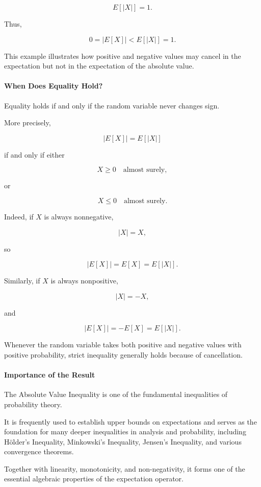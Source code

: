 \documentclass[11pt]{article}
\begin{document}
\begin{mdframed}[
		linewidth=0.8pt,
		roundcorner=6pt,
		backgroundcolor=gray!5,
		linecolor=gray!60,
		innertopmargin=10pt,
		innerbottommargin=10pt,
		innerleftmargin=10pt,
		innerrightmargin=10pt
		]
		\[
		E[|X|]
		=
		1.
		\]
		
		Thus,
		
		\[
		\boxed{
			0
			=
			|E[X]|
			<
			E[|X|]
			=
			1.
		}
		\]
		
		This example illustrates how positive and negative values may cancel in the
		expectation but not in the expectation of the absolute value.
		
		\bigskip
		
		\paragraph{When Does Equality Hold?}
		
		Equality holds if and only if the random variable never changes sign.
		
		More precisely,
		
		\[
		|E[X]|
		=
		E[|X|]
		\]
		
		if and only if either
		
		\[
		X\ge0
		\quad
		\text{almost surely},
		\]
		
		or
		
		\[
		X\le0
		\quad
		\text{almost surely}.
		\]
		
		Indeed, if \(X\) is always nonnegative,
		
		\[
		|X|=X,
		\]
		
		so
		
		\[
		|E[X]|
		=
		E[X]
		=
		E[|X|].
		\]
		
		Similarly, if \(X\) is always nonpositive,
		
		\[
		|X|=-X,
		\]
		
		and
		
		\[
		|E[X]|
		=
		-E[X]
		=
		E[|X|].
		\]
		
		Whenever the random variable takes both positive and negative values with
		positive probability, strict inequality generally holds because of
		cancellation.
		
		\bigskip
		
		\paragraph{Importance of the Result}
		
		The Absolute Value Inequality is one of the fundamental inequalities of
		probability theory.
		
		It is frequently used to establish upper bounds on expectations and serves
		as the foundation for many deeper inequalities in analysis and probability,
		including Hölder's Inequality, Minkowski's Inequality, Jensen's Inequality,
		and various convergence theorems.
		
		Together with linearity, monotonicity, and non-negativity, it forms one of
		the essential algebraic properties of the expectation operator.
		
	\end{mdframed}
	
\end{document}
